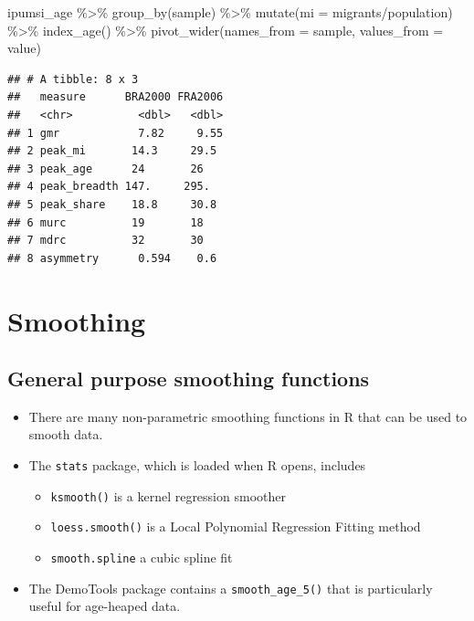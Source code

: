 \documentclass[
]{book}
\newenvironment{Shaded}{\begin{snugshade}}{\end{snugshade}}
\newcommand{\AttributeTok}[1]{\textcolor[rgb]{0.77,0.63,0.00}{#1}}
\newcommand{\FunctionTok}[1]{\textcolor[rgb]{0.00,0.00,0.00}{#1}}
\newcommand{\NormalTok}[1]{#1}
\newcommand{\SpecialCharTok}[1]{\textcolor[rgb]{0.00,0.00,0.00}{#1}}
\providecommand{\tightlist}{%
  \setlength{\itemsep}{0pt}\setlength{\parskip}{0pt}}
\begin{document}
\begin{Shaded}
\begin{Highlighting}[]
\NormalTok{ipumsi\_age }\SpecialCharTok{\%\textgreater{}\%}
  \FunctionTok{group\_by}\NormalTok{(sample) }\SpecialCharTok{\%\textgreater{}\%}
  \FunctionTok{mutate}\NormalTok{(}\AttributeTok{mi =}\NormalTok{ migrants}\SpecialCharTok{/}\NormalTok{population) }\SpecialCharTok{\%\textgreater{}\%}
  \FunctionTok{index\_age}\NormalTok{() }\SpecialCharTok{\%\textgreater{}\%}
  \FunctionTok{pivot\_wider}\NormalTok{(}\AttributeTok{names\_from =}\NormalTok{ sample, }\AttributeTok{values\_from =}\NormalTok{ value)}
\end{Highlighting}
\end{Shaded}

\begin{verbatim}
## # A tibble: 8 x 3
##   measure      BRA2000 FRA2006
##   <chr>          <dbl>   <dbl>
## 1 gmr            7.82     9.55
## 2 peak_mi       14.3     29.5 
## 3 peak_age      24       26   
## 4 peak_breadth 147.     295.  
## 5 peak_share    18.8     30.8 
## 6 murc          19       18   
## 7 mdrc          32       30   
## 8 asymmetry      0.594    0.6
\end{verbatim}

\hypertarget{smoothing}{%
\section{Smoothing}\label{smoothing}}

\hypertarget{general-purpose-smoothing-functions}{%
\subsection{General purpose smoothing functions}\label{general-purpose-smoothing-functions}}

\begin{itemize}
\tightlist
\item
  There are many non-parametric smoothing functions in R that can be used to smooth data.
\item
  The \texttt{stats} package, which is loaded when R opens, includes

  \begin{itemize}
  \tightlist
  \item
    \texttt{ksmooth()} is a kernel regression smoother
  \item
    \texttt{loess.smooth()} is a Local Polynomial Regression Fitting method
  \item
    \texttt{smooth.spline} a cubic spline fit
  \end{itemize}
\item
  The DemoTools package contains a \texttt{smooth\_age\_5()} that is particularly useful for age-heaped data.
\end{itemize}
\end{document}
